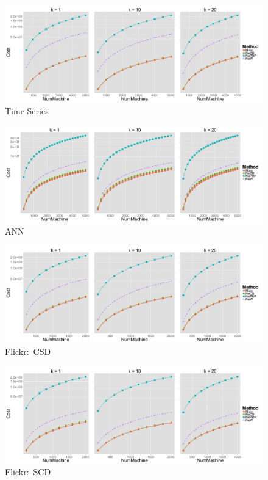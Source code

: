 \begin{figure}[htpb!]
  \centering
  \includegraphics[width=1.0\linewidth]{exp/in/time.png}
  \caption{Time Series}
  \label{fig:in_time}
\end{figure}

\begin{figure}[htpb!]
  \centering
  \includegraphics[width=1.0\linewidth]{exp/in/ANN.png}
  \caption{ANN}
  \label{fig:in_ANN}
\end{figure}

\begin{figure}[htpb!]
  \centering
  \includegraphics[width=1.0\linewidth]{exp/in/f2.png}
  \caption{Flickr:~CSD}
  \label{fig:in_f2}
\end{figure}

\begin{figure}[htpb!]
  \centering
  \includegraphics[width=1.0\linewidth]{exp/in/f3.png}
  \caption{Flickr:~SCD}
  \label{fig:in_f3}
\end{figure}

